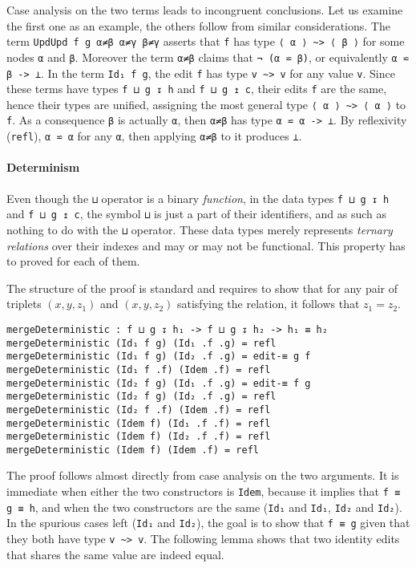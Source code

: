 \documentclass[../Thesis.tex]{subfiles}
\begin{document}
	Case analysis on the two terms leads to incongruent conclusions.
	Let us examine the first one as an example, the others follow from 
	similar considerations.
	The term \texttt{UpdUpd f g α≠β α≠γ β≠γ} asserts that 
	\texttt{f} has type \texttt{⟨ α ⟩ \textasciitilde> ⟨ β ⟩} for some 
	nodes \texttt{α} and \texttt{β}. Moreover the term
	\texttt{α≠β} claims that \texttt{¬ (α ⋍ β)}, or equivalently
	\texttt{α ⋍ β -> ⊥}.
	In the term \texttt{Id₁ f g}, the edit \texttt{f} 
	has type \texttt{v \textasciitilde> v} for any value \texttt{v}. Since these 
	terms have types	\texttt{f ⊔ g ↧ h} and \texttt{f ⊔ g ↥ c}, their edits 
	\texttt{f} are the same, hence their types are unified, assigning the most 
	general type \texttt{⟨ α ⟩ \textasciitilde> ⟨ α ⟩} to \texttt{f}.
	As a consequence \texttt{β} is actually \texttt{α}, then \texttt{α≠β}
	has type \texttt{α ⋍ α -> ⊥}. By reflexivity (\texttt{refl}), \texttt{α ⋍ α} for
	any \texttt{α}, then applying \texttt{α≠β} to it produces \texttt{⊥}.
	
	\paragraph{Determinism}
	\label{par:Determinism}
	Even though the \texttt{⊔} operator is a binary \emph{function}, 
	in the data types \texttt{f ⊔ g ↧ h} and \texttt{f ⊔ g ↥ c}, the symbol
	\texttt{⊔} is just a part of their identifiers, and as such as nothing to
	do with the \texttt{⊔} operator.
	These data types merely represents \emph{ternary relations} over their 
	indexes and may or may not be functional.
	This property has to proved for each of them.
	
	The structure of the proof is standard and requires to show that for any 
	pair of triplets $(x, y, z_1)$ and $(x, y, z_2)$ satisfying
	the relation, it follows that $z_1 = z_2$.
	
\begin{verbatim}
mergeDeterministic : f ⊔ g ↧ h₁ -> f ⊔ g ↧ h₂ -> h₁ ≡ h₂
mergeDeterministic (Id₁ f g) (Id₁ .f .g) = refl
mergeDeterministic (Id₁ f g) (Id₂ .f .g) = edit-≡ g f
mergeDeterministic (Id₁ f .f) (Idem .f) = refl
mergeDeterministic (Id₂ f g) (Id₁ .f .g) = edit-≡ f g
mergeDeterministic (Id₂ f g) (Id₂ .f .g) = refl
mergeDeterministic (Id₂ f .f) (Idem .f) = refl
mergeDeterministic (Idem f) (Id₁ .f .f) = refl
mergeDeterministic (Idem f) (Id₂ .f .f) = refl
mergeDeterministic (Idem f) (Idem .f) = refl
\end{verbatim}

	The proof follows almost directly from case analysis on the two arguments.
	It is immediate when either the two constructors is \texttt{Idem}, because
	it implies that \texttt{f ≡ g ≡ h}, and when the two constructors are the 
	same (\texttt{Id₁} and \texttt{Id₁}, \texttt{Id₂} and \texttt{Id₂}).
	In the spurious cases left (\texttt{Id₁} and \texttt{Id₂}), the goal
	is to show that \texttt{f ≡ g} 
	given that they both have type \texttt{v \textasciitilde> v}.
	The following lemma shows that two identity edits that shares the same 
	value are indeed equal.
	
\end{document}
